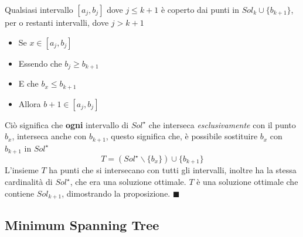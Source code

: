 \documentclass[12pt, letterpaper]{article}
\begin{document}
Qualsiasi intervallo $[a_j,b_j]$ dove $j\le k+1$ è coperto dai punti in $Sol_k\cup\{b_{k+1}\}$, per o restanti intervalli,
dove $j>k+1$\begin{itemize}
    \item Se $x\in [a_j,b_j]$
    \item Essendo che $b_j\ge b_{k+1}$
    \item E che $b_x \le b_{k+1}$
    \item Allora $b+1\in [a_j,b_j]$
\end{itemize}
Ciò significa che \textbf{ogni} intervallo di $Sol^\star$ che interseca \textit{esclusivamente} con il punto $b_x$, interseca
anche con $b_{k+1}$, questo significa che, è possibile sostituire $b_x$ con $b_{k+1}$ in $Sol^\star$
$$ T=(Sol^\star \backslash \{b_x\})\cup \{b_{k+1}\}$$
L'insieme $T$ ha punti che si intersecano con tutti gli intervalli, inoltre ha la stessa cardinalità di $Sol^\star$, che era una
soluzione ottimale. $T$ è una soluzione ottimale che contiene $Sol_{k+1}$, dimostrando la proposizione. $\blacksquare$

\subsection{Minimum Spanning Tree}
\end{document}
